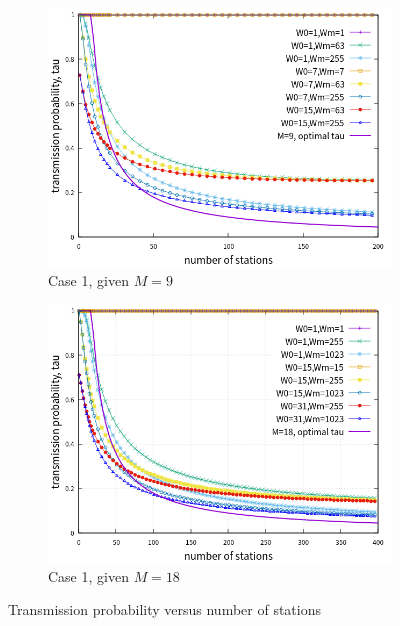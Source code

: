\documentclass[journal]{IEEEtran}
\begin{document}
\begin{figure}[!t]
\centering
\begin{subfigure}{0.5\textwidth}
\includegraphics[scale=.54]{./figure/chp4/M9/n_tau_perf_M9_x200.png}
\caption{Case 1, given $M=9$}
\label{fig_tau_n_M9}
\end{subfigure}
\begin{subfigure}{0.5\textwidth}
\includegraphics[scale=.54]{./figure/chp4/M18/n_tau_perf_M18_x400.png}
\caption{Case 1, given $M=18$}
\label{fig_tau_n_M18}
\end{subfigure}
\caption{Transmission probability versus number of stations}
\label{fig_tau_n}
\end{figure}
\end{document}
